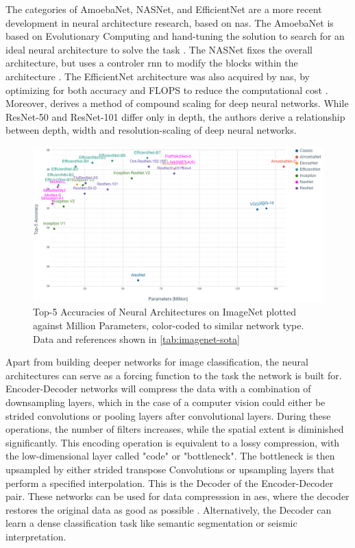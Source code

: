 The categories of AmoebaNet, NASNet, and EfficientNet are a more recent development in neural architecture research, based on \acf{nas}. The AmoebaNet is based on Evolutionary Computing and hand-tuning the solution to search for an ideal neural architecture to solve the task \citep{real2019regularized}. The NASNet fixes the overall architecture, but uses a controler \ac{rnn} to modify the blocks within the architecture \citep{zoph2018learning}. The EfficientNet architecture was also acquired by \ac{nas}, by optimizing for both accuracy and FLOPS to reduce the computational cost \citep{tan2019efficientnet}. Moreover, \citet{tan2019efficientnet} derives a method of compound scaling for deep neural networks. While ResNet-50 and ResNet-101 differ only in depth, the authors derive a relationship between depth, width and resolution-scaling of deep neural networks.

\begin{figure}
    \centering
    \includegraphics[width=1.1\textwidth]{figures/imagenetsota.png}
    \caption{Top-5 Accuracies of Neural Architectures on ImageNet plotted against Million Parameters, color-coded to similar network type. Data and references shown in \cref{tab:imagenet-sota}}
    \label{fig:cnnsota}
\end{figure}

Apart from building deeper networks for image classification, the neural architectures can serve as a  forcing function to the task the network is built for. Encoder-Decoder networks will compress the data with a combination of downsampling layers, which in the case of a computer vision could either be strided convolutions or pooling layers after convolutional layers. During these operations, the number of filters increases, while the spatial extent is diminished significantly. This encoding operation is equivalent to a lossy compression, with the low-dimensional layer called "code" or "bottleneck". The bottleneck is then upsampled by either strided transpose Convolutions or upsampling layers that perform a specified interpolation. This is the Decoder of the Encoder-Decoder pair. These networks can be used for data compresssion in \acp{ae}, where the decoder restores the original data as good as possible \citep{hinton2006reducing}. Alternatively, the Decoder can learn a dense classification task like semantic segmentation or seismic interpretation.

